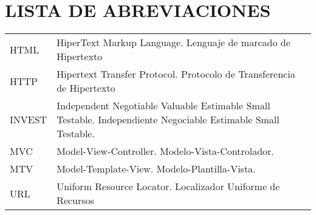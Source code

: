 \chapter*{LISTA DE ABREVIACIONES}

\begin{tabular}{l p{12cm}}
    HTML \hspace{2cm}   & HiperText Markup Language. Lenguaje de marcado de Hipertexto \\
    HTTP \hspace{2cm}   & Hipertext Transfer Protocol. Protocolo de 
                               Transferencia de Hipertexto            \\
    INVEST \hspace{2cm} &  Independent Negotiable Valuable Estimable Small Testable. Independiente Negociable Estimable Small Testable. \\
    MVC \hspace{2cm}    & Model-View-Controller. Modelo-Vista-Controlador.\\
    MTV \hspace{2cm}    & Model-Template-View. Modelo-Plantilla-Vista. \\
    URL	 \hspace{2cm}   & Uniform Resource Locator. Localizador Uniforme de Recursos \\

\end{tabular}
\clearpage

